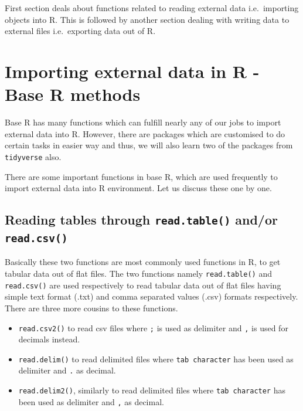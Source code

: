 \documentclass[
]{book}
\providecommand{\tightlist}{%
  \setlength{\itemsep}{0pt}\setlength{\parskip}{0pt}}
\begin{document}
First section deals about functions related to reading external data i.e.~importing objects into R. This is followed by another section dealing with writing data to external files i.e.~exporting data out of R.

\hypertarget{importing-external-data-in-r---base-r-methods}{%
\section{Importing external data in R - Base R methods}\label{importing-external-data-in-r---base-r-methods}}

Base R has many functions which can fulfill nearly any of our jobs to import external data into R. However, there are packages which are customised to do certain tasks in easier way and thus, we will also learn two of the packages from \texttt{tidyverse} also.

There are some important functions in base R, which are used frequently to import external data into R environment. Let us discuss these one by one.

\hypertarget{reading-tables-through-read.table-andor-read.csv}{%
\subsection*{\texorpdfstring{Reading tables through \texttt{read.table()} and/or \texttt{read.csv()}}{Reading tables through read.table() and/or read.csv()}}\label{reading-tables-through-read.table-andor-read.csv}}

Basically these two functions are most commonly used functions in R, to get tabular data out of flat files. The two functions namely \texttt{read.table()} and \texttt{read.csv()} are used respectively to read tabular data out of flat files having simple text format (.txt) and comma separated values (.csv) formats respectively. There are three more cousins to these functions.

\begin{itemize}
\tightlist
\item
  \texttt{read.csv2()} to read csv files where \texttt{;} is used as delimiter and \texttt{,} is used for decimals instead.
\item
  \texttt{read.delim()} to read delimited files where \texttt{tab\ character} has been used as delimiter and \texttt{.} as decimal.
\item
  \texttt{read.delim2()}, similarly to read delimited files where \texttt{tab\ character} has been used as delimiter and \texttt{,} as decimal.
\end{itemize}
\end{document}

